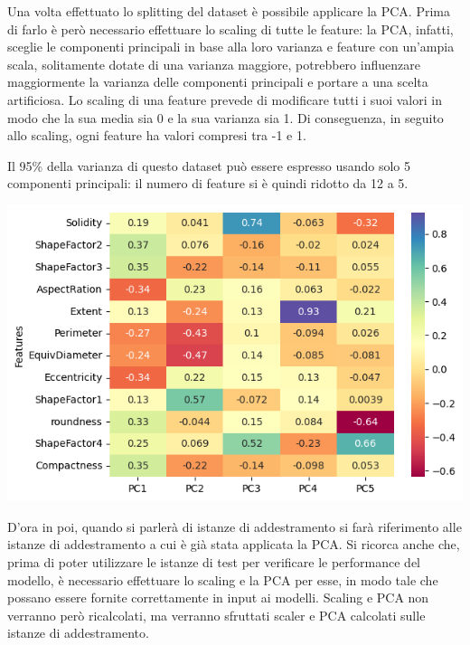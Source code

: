 Una volta effettuato lo splitting del dataset è possibile applicare la PCA.
Prima di farlo è però necessario effettuare lo scaling di tutte
le feature: la PCA, infatti, sceglie le componenti principali in base alla
loro varianza e feature con un'ampia scala, solitamente dotate di una 
varianza maggiore, potrebbero influenzare maggiormente la varianza delle
componenti principali e portare a una scelta artificiosa.
Lo scaling di una feature prevede di modificare tutti i suoi valori in modo 
che la sua media sia 0 e la sua varianza sia 1.
Di conseguenza, in seguito allo scaling, ogni feature ha valori compresi tra -1
e 1.

Il 95\% della varianza di questo dataset può essere espresso usando solo
5 componenti principali: il numero di feature si è quindi ridotto da 12 a 5.

\begin{Figure}
    \centering
    \includegraphics[width=\linewidth]{img/pca_features_weights.png}
\end{Figure}

D'ora in poi, quando si parlerà di istanze di addestramento si farà riferimento
alle istanze di addestramento a cui è già stata applicata la PCA.
Si ricorca anche che, prima di poter utilizzare le istanze di test per verificare
le performance del modello, è necessario effettuare lo scaling e la PCA per esse,
in modo tale che possano essere fornite correttamente in input ai modelli.
Scaling e PCA non verranno però ricalcolati, ma verranno sfruttati scaler e 
PCA calcolati sulle istanze di addestramento. 
